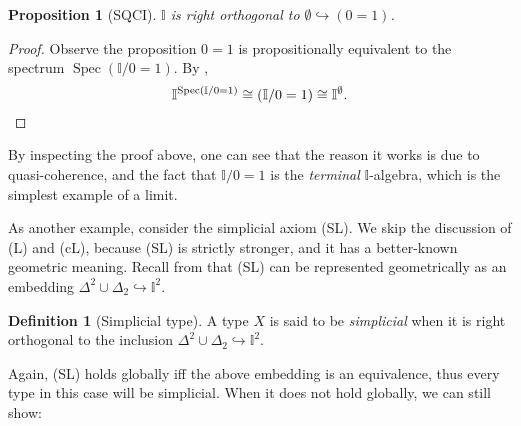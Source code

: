 \documentclass[12pt]{amsart}
\newtheorem{proposition}[theorem]{Proposition}
\theoremstyle{definition}
\newtheorem{definition}[theorem]{Definition}
\newcommand{\mbb}[1]{\mathbb{#1}}
\newcommand{\I}{\mbb I}
\newcommand{\hook}{\hookrightarrow}
\newcommand{\emp}{\emptyset}
\newcommand{\spec}{\operatorname{Spec}}
\begin{document}
\begin{proposition}[SQCI]\label{specisnontrivial}
  $\I$ is right orthogonal to $\emp \hook (0 = 1)$.
\end{proposition}
\begin{proof}
  Observe the proposition $0 = 1$ is propositionally equivalent to the spectrum $\spec(\I/0=1)$. By ,
  \[ \I^{\spec(\I/0=1)} \cong (\I/0=1) \cong \I^\emp. \qedhere \]
\end{proof}

By inspecting the proof above, one can see that the reason it works is due to quasi-coherence, and the fact that $\I/0=1$ is the \emph{terminal} $\I$-algebra, which is the simplest example of a limit.

As another example, consider the simplicial axiom (SL). We skip the discussion of (L) and (cL), because (SL) is strictly stronger, and it has a better-known geometric meaning. Recall from  that (SL) can be represented geometrically as an embedding $\Delta^2\cup\Delta_2 \hook \I^2$.

\begin{definition}[Simplicial type]
  A type $X$ is said to be \emph{simplicial} when it is right orthogonal to the inclusion $\Delta^2 \cup \Delta_2 \hook \I^2$.
\end{definition}

Again, (SL) holds globally iff the above embedding is an equivalence, thus every type in this case will be simplicial. When it does not hold globally, we can still show:
\end{document}
